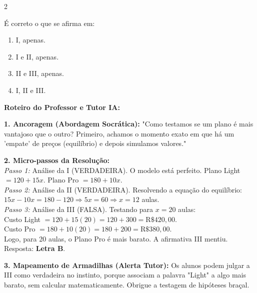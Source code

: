 \begin{multicols*}{2}
\begin{enunciadoLiteral}
É correto o que se afirma em:

\begin{enumerate}[label=\alph*), itemsep=\espacoAlt]
\item I, apenas.
\item I e II, apenas.
\item II e III, apenas.
\item I, II e III.
\end{enumerate}
\end{enunciadoLiteral}

\ifgabarito
    \begin{tcolorbox}[colback=CorTitUm!5, colframe=CorTitUm, boxrule=1pt, arc=4pt, left=6pt, right=6pt, top=6pt, bottom=6pt]
    \small\textbf{\textcolor{CorTitUm}{Roteiro do Professor e Tutor IA:}}\par\vspace{0.1cm}
    \color{CinzaEscuro}
    \textbf{1. Ancoragem (Abordagem Socrática):} "Como testamos se um plano é mais vantajoso que o outro? Primeiro, achamos o momento exato em que há um 'empate' de preços (equilíbrio) e depois simulamos valores."\par\vspace{0.1cm}
    
    \textbf{2. Micro-passos da Resolução:}\\
    \textit{Passo 1:} Análise da I (VERDADEIRA). O modelo está perfeito. Plano Light $= 120 + 15x$. Plano Pro $= 180 + 10x$.\\
    \textit{Passo 2:} Análise da II (VERDADEIRA). Resolvendo a equação do equilíbrio: $15x - 10x = 180 - 120 \Rightarrow 5x = 60 \Rightarrow x = 12$ aulas.\\
    \textit{Passo 3:} Análise da III (FALSA). Testando para $x = 20$ aulas:\\
    Custo Light $= 120 + 15(20) = 120 + 300 = \text{R\$ } 420,00$.\\
    Custo Pro $= 180 + 10(20) = 180 + 200 = \text{R\$ } 380,00$.\\
    Logo, para 20 aulas, o Plano Pro é mais barato. A afirmativa III mentiu. Resposta: \textbf{Letra B}.\par\vspace{0.1cm}
    
    \textbf{3. Mapeamento de Armadilhas (Alerta Tutor):} Os alunos podem julgar a III como verdadeira no instinto, porque associam a palavra "Light" a algo mais barato, sem calcular matematicamente. Obrigue a testagem de hipóteses braçal.
    \end{tcolorbox}
    \vspace{0.15cm}
    

\end{multicols*}
